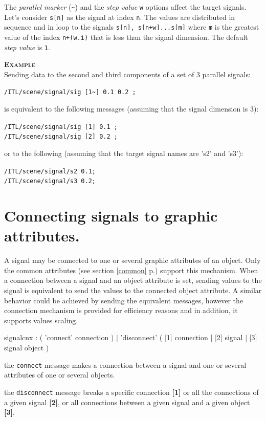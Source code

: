 \documentclass[a4paper,twoside]{report}
\newcommand{\sublevel}[1]	{\section{#1}}
\newcommand{\fullref}[1]	{\ref{#1} p.\pageref{#1}}
\newcommand{\OSC}[1]		{\texttt{#1}}
\newcommand{\values}[1]		{\texttt{#1}}
\newcommand{\example}		{\textbf{\hspace{-1.5cm}\textbf{\textsc{Example }}}}
\let\olditemize\itemize
\let\oldenditemize\enditemize
\renewenvironment{itemize} 	{\olditemize \setlength{\itemsep}{1mm}}{\oldenditemize}
\newcommand{\sample}	[1]			{\vspace{-2mm}\begin{center}\colorbox{mygrey}{
								\begin{minipage}[t]{0.9\columnwidth} 
								{\small \texttt{#1}}
								\end{minipage}}\end{center}}
\newcommand{\sampleindent}	{ \hspace{0.5cm} }
\begin{document}
The \emph{parallel marker} (\OSC{\~{}}) and the \emph{step value} \values{w} options affect the target signals. Let's consider \values{s[n]} as the signal at index \values{n}. The values are distributed in sequence and in loop to the signals \values{s[n], s[n+w]...s[m]} where \values{m} is the greatest value of the index \values{n+(w.i)} that is less than the signal dimension. The default  \emph{step value} is \values{1}.

\example \\
Sending data to the second and third components of a set of 3 parallel signals:
\sample{/ITL/scene/signal/sig [1\~{}] 0.1 0.2 ;}
\sampleindent is equivalent to the following messages (assuming that the signal dimension is 3):
\sample{/ITL/scene/signal/sig [1] 0.1 ;\\
/ITL/scene/signal/sig [2] 0.2 ;
}
\sampleindent or to the following (assuming that the target signal names are 's2' and 's3'):
\sample{/ITL/scene/signal/s2 0.1;\\
/ITL/scene/signal/s3 0.2;
}


\sublevel{Connecting signals to graphic attributes.}
\label{signalcnx}

A signal may be connected to one or several graphic attributes of an object. Only the common attributes  (see section \fullref{common}) support this mechanism.
When a connection between a signal and an object attribute is set, sending values to the signal is equivalent to send the values to the connected object attribute. A similar behavior could be achieved by sending the equivalent messages, however the connection mechanism is provided for efficiency reasons and in addition, it supports values scaling. 

\begin{rail}
signalcnx : 	( 'connect'   connection )
			| 	'disconnect' ( [1] connection | [2] signal | [3]  signal object )
\end{rail}

\begin{itemize}
\item the \OSC{connect} message makes a connection between a signal and one or several attributes of one or several objects.
\item the \OSC{disconnect} message breaks a specific connection \textbf{[1]} or all the connections of a given signal \textbf{[2]}, or all connections between a given signal and a given object \textbf{[3]}.
\end{itemize}
\end{document}
